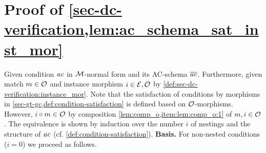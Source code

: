 \section{Proof of \cref{sec-dc-verification,lem:ac_schema_sat_inst_mor}}
\label{sec-proofs:lem:ac_schema_sat_inst_mor}
Given condition $\mathit{ac}$ in ${\cal M}$-normal form and its AC-schema $\overline{\mathit{ac}}$.\thispagestyle{plain}
Furthermore, given match $m \in {\cal O}$ and instance morphism $i \in \mathcal{E},{\cal O}$ by \cref{def:sec-dc-verification:instance_mor}.
Note that the satisfaction of conditions by morphisms in \cref{sec-gt-gc,def:condition-satisfaction} is defined based on ${\cal O}$-morphisms.
However, $i \circ m \in {\cal O}$ by composition \cref{lem:comp_o,item:lem:comp_o:1} of $m,i \in {\cal O}$.
The equivalence is shown by induction over the number $i$ of nestings and the structure of $\mathit{ac}$ (cf. \cref{def:condition-satisfaction}).
\textbf{Basis.} For non-nested conditions ($i=0$) we proceed as follows.
